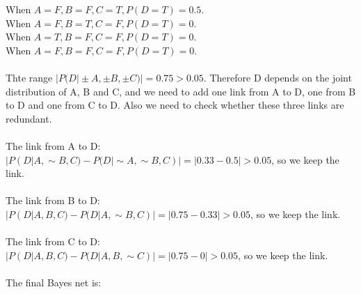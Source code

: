 \documentclass[english]{article}
\begin{document}
\begin{enumerate}
    When $A=F, B=F, C=T, P(D=T)=0.5$.\\
    When $A=F, B=T, C=F, P(D=T)=0$.\\
    When $A=T, B=F, C=F, P(D=T)=0$.\\
    When $A=F, B=F, C=F, P(D=T)=0$.\\\\
    Thte range $|P(D|\pm A, \pm B, \pm C)| = 0.75 > 0.05$. Therefore D depends on the joint distribution of A, B and C, and we need to add one link from A to D, one from B to D and one from C to D. Also we need to check whether these three links are redundant.\\\\
    The link from A to D:\\
    $|P(D|A, \sim B, C)-P(D|\sim A,\sim B,C)|=|0.33-0.5|>0.05$, so we keep the link.\\\\
    The link from B to D:\\
    $|P(D|A, B, C)-P(D|A,\sim B,C)|=|0.75-0.33|>0.05$, so we keep the link.\\\\
    The link from C to D:\\
    $|P(D|A, B, C)-P(D|A,B,\sim C)|=|0.75-0|>0.05$, so we keep the link.\\\\
    The final Bayes net is:
\begin{center}
\end{center}
\end{enumerate}
\clearpage
\end{document}
